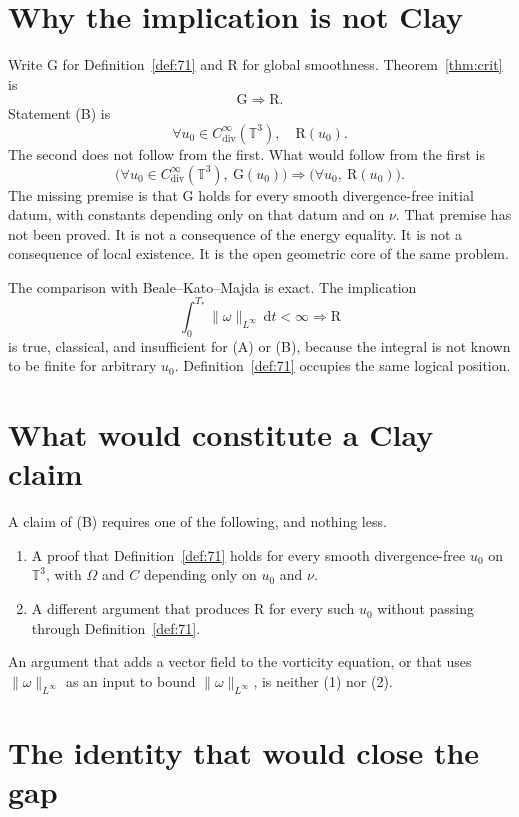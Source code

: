 \documentclass[11pt,a4paper]{article}
\theoremstyle{definition}
\theoremstyle{remark}
\newcommand{\T}{\mathbb{T}}
\newcommand{\norm}[1]{\lVert#1\rVert}
\begin{document}
\section{Why the implication is not Clay}

Write $\mathrm{G}$ for Definition~\ref{def:71} and $\mathrm{R}$ for global smoothness. Theorem~\ref{thm:crit} is
\[
\mathrm{G}\Longrightarrow\mathrm{R}.
\]
Statement (B) is
\[
\forall u_0\in C^\infty_{\mathrm{div}}(\T^3),\quad \mathrm{R}(u_0).
\]
The second does not follow from the first. What would follow from the first is
\[
\bigl(\forall u_0\in C^\infty_{\mathrm{div}}(\T^3),\ \mathrm{G}(u_0)\bigr)\Longrightarrow\bigl(\forall u_0,\ \mathrm{R}(u_0)\bigr).
\]
The missing premise is that $\mathrm{G}$ holds for every smooth divergence-free initial datum, with constants depending only on that datum and on $\nu$. That premise has not been proved. It is not a consequence of the energy equality. It is not a consequence of local existence. It is the open geometric core of the same problem.

The comparison with Beale--Kato--Majda is exact. The implication
\[
\int_0^{T_*}\norm{\omega}_{L^\infty}\,\mathrm{d}t<\infty\Longrightarrow\mathrm{R}
\]
is true, classical, and insufficient for (A) or (B), because the integral is not known to be finite for arbitrary $u_0$. Definition~\ref{def:71} occupies the same logical position.

\section{What would constitute a Clay claim}

A claim of (B) requires one of the following, and nothing less.

\begin{enumerate}[label=\textup{(\arabic*)}]
\item A proof that Definition~\ref{def:71} holds for every smooth divergence-free $u_0$ on $\T^3$, with $\Omega$ and $C$ depending only on $u_0$ and $\nu$.
\item A different argument that produces $\mathrm{R}$ for every such $u_0$ without passing through Definition~\ref{def:71}.
\end{enumerate}

An argument that adds a vector field to the vorticity equation, or that uses $\norm{\omega}_{L^\infty}$ as an input to bound $\norm{\omega}_{L^\infty}$, is neither (1) nor (2).

\section{The identity that would close the gap}
\end{document}
